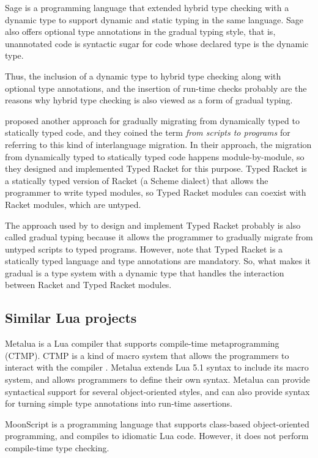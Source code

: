 \documentclass[preprint]{sig-alternate}
\begin{document}
Sage \citep{gronski2006sage} is a programming language that
extended hybrid type checking with a dynamic type to
support dynamic and static typing in the same language.
Sage also offers optional type annotations in the gradual typing
style, that is, unannotated code is syntactic sugar for
code whose declared type is the dynamic type.

Thus, the inclusion of a dynamic type to hybrid type checking
along with optional type annotations, and the insertion of run-time
checks probably are the reasons why hybrid type checking is
also viewed as a form of gradual typing. 

\citet{tobin-hochstadt2006ims} proposed another approach for gradually
migrating from dynamically typed to statically typed code,
and they coined the term \textit{from scripts to programs} for
referring to this kind of interlanguage migration.
In their approach, the migration from dynamically typed to
statically typed code happens module-by-module, so they designed
and implemented Typed Racket \citep{tobin-hochstadt2008ts} for
this purpose.
Typed Racket is a statically typed version of Racket
(a Scheme dialect) that allows the programmer to write typed modules,
so Typed Racket modules can coexist with Racket modules,
which are untyped.

The approach used by \citet{tobin-hochstadt2008ts} to design and
implement Typed Racket probably is also called gradual typing
because it allows the programmer to gradually migrate from untyped
scripts to typed programs.
However, note that Typed Racket is a statically typed language
and type annotations are mandatory.
So, what makes it gradual is a type system with a dynamic type
that handles the interaction between Racket and Typed Racket modules.

\subsection{Similar Lua projects}

Metalua \citep{metalua} is a Lua compiler that supports compile-time
metaprogramming (CTMP).
CTMP is a kind of macro system that allows the programmers to interact
with the compiler \citep{fleutot2007contrasting}. 
Metalua extends Lua 5.1 syntax to include its macro system,
and allows programmers to define their own syntax.
Metalua can provide syntactical support for several object-oriented
styles, and can also provide syntax for turning simple type
annotations into run-time assertions.

MoonScript \citep{moonscript} is a programming language that supports
class-based object-oriented programming, and compiles to idiomatic
Lua code.
However, it does not perform compile-time type checking.
\end{document}
